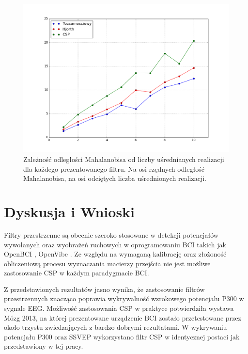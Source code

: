 \documentclass[licencjacka,openright]{pracamgr}
\begin{document}
\begin{figure}
\centering
\includegraphics[scale=0.6, trim=10mm 15mm 10mm 18mm, clip=True]{pics/mahalanobis.png}
\caption{Zależność odległości Mahalanobisa od liczby uśrednianych realizacji dla każdego prezentowanego filtru. Na osi rzędnych odległość Mahalanobisa, na osi odciętych liczba uśrednionych realizacji.}
\label{mahalanobis_pic}
\end{figure}

\chapter{Dyskusja i Wnioski}
Filtry przestrzenne są obecnie szeroko stosowane w detekcji potencjałów wywołanych oraz wyobrażeń ruchowych w oprogramowaniu BCI takich jak OpenBCI \citep{obci_conf}, OpenVibe \citep{renard2010}. Ze względu na wymaganą kalibrację oraz złożoność obliczeniową procesu wyznaczania macierzy przejścia nie jest możliwe zastosowanie CSP w każdym paradygmacie BCI.

Z przedstawionych rezultatów jasno wynika, że zastosowanie filtrów przestrzennych znacząco poprawia wykrywalność wzrokowego potencjału P300 w sygnale EEG. Możliwość zastosowania CSP w praktyce potwierdziła wystawa Mózg 2013, na której prezentowane urządzenie BCI zostało przetestowane przez około trzystu zwiedzających z bardzo dobrymi rezultatami. W wykrywaniu potencjału P300 oraz SSVEP wykorzystano filtr CSP w identycznej postaci jak przedstawiony w tej pracy.


\end{document}
